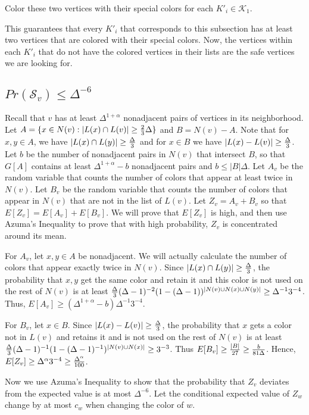 \documentclass[12pt]{article}
\theoremstyle{definition}
\begin{document}
Color these two vertices with their special colors for each $K'_i\in \mathcal{K}_1$. 

This guarantees that every $K'_i$ that corresponds to this subsection has at least two vertices that are colored with their special colors. 
Now, the vertices within each $K'_i$ that do not have the colored vertices in their lists are the safe vertices we are looking for. 

\subsection{$Pr(\mathcal{S}_v)\leq \Delta^{-6}$}

Recall that $v$ has at least $\Delta^{1+\alpha}$ nonadjacent pairs of vertices in its neighborhood. 
Let $A=\{x\in N(v): |L(x)\cap L(v)|\geq {2\over 3}\Delta\}$ and $B=N(v)-A$. Note that for $x,y\in A$, we have $|L(x)\cap L(y)|\geq {\Delta\over 3}$ and for $x\in B$ we have $|L(x)-L(v)|\geq {\Delta\over 3}$. 
Let $b$ be the number of nonadjacent pairs in $N(v)$ that intersect $B$, so that $G[A]$ contains at least $\Delta^{1+\alpha}-b$ nonadjacent pairs and $b\leq |B|\Delta$. 
Let $A_v$ be the random variable that counts the number of colors that appear at least twice in $N(v)$. 
Let $B_v$ be the random variable that counts the number of colors that appear in $N(v)$ that are not in the list of $L(v)$. 
Let $Z_v=A_v+B_v$ so that $E[Z_v]=E[A_v]+E[B_v]$. 
We will prove that $E[Z_v]$ is high, and then use Azuma's Inequality to prove that with high probability, $Z_v$ is concentrated around its mean. 

For $A_v$, let $x, y\in A$ be nonadjacent. 
We will actually calculate the number of colors that appear exactly twice in $N(v)$. 
Since $|L(x)\cap L(y)|\geq {\Delta\over 3}$, the probability that $x, y$ get the same color and retain it and this color is not used on the rest of $N(v)$ is at least ${\Delta\over 3}(\Delta-1)^{-2}(1-(\Delta-1))^{|N(v)\cup N(x)\cup N(y)|}\geq \Delta^{-1}3^{-4}$. 
Thus, $E[A_v]\geq (\Delta^{1+\alpha}-b)\Delta^{-1}3^{-4}$.

For $B_v$, let $x\in B$. 
Since $|L(x)-L(v)|\geq {\Delta\over 3}$, the probability that $x$ gets a color not in $L(v)$ and retains it and is not used on the rest of $N(v)$ is at least ${\Delta\over 3}(\Delta-1)^{-1}(1-(\Delta-1)^{-1})^{|N(v)\cup N(x)|}\geq 3^{-3}$. 
Thus $E[B_v]\geq {|B|\over 27}\geq {b\over 81\Delta}$. 
Hence, $E[Z_v]\geq\Delta^{\alpha}3^{-4}\geq {\Delta^\alpha \over 100}$.

Now we use Azuma's Inequality to show that the probability that $Z_v$ deviates from the expected value is at most $\Delta^{-6}$. 
Let the conditional expected value of $Z_w$ change by at most $c_w$ when changing the color of $w$. 
\end{document}
